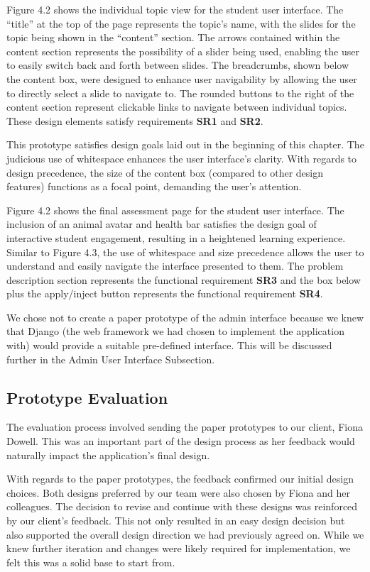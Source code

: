 \documentclass{l3proj}
\begin{document}
Figure 4.2 shows the individual topic view for the student user interface. The ``title'' at the top of the page represents the topic's name, with the slides for the topic being shown in the ``content'' section. The arrows contained within the content section represents the possibility of a slider being used, enabling the user to easily switch back and forth between slides. The breadcrumbs, shown below the content box, were designed to enhance user navigability by allowing the user to directly select a slide to navigate to. The rounded buttons to the right of the content section represent clickable links to navigate between individual topics. These design elements satisfy requirements \textbf{SR1} and \textbf{SR2}.

This prototype satisfies design goals laid out in the beginning of this chapter. The judicious use of whitespace enhances the user interface's clarity. With regards to design precedence, the size of the content box (compared to other design features) functions as a focal point, demanding the user's attention. 

Figure 4.2 shows the final assessment page for the student user interface. The inclusion of an animal avatar and health bar satisfies the design goal of interactive student engagement, resulting in a heightened learning experience. Similar to Figure 4.3, the use of whitespace and size precedence allows the user to understand and easily navigate the interface presented to them. The problem description section represents the functional requirement \textbf{SR3} and the box below plus the apply/inject button represents the functional requirement \textbf{SR4}.  

We chose not to create a paper prototype of the admin interface because we knew that Django (the web framework we had chosen to implement the application with) would provide a suitable pre-defined interface. This will be discussed further in the Admin User Interface Subsection. 
 
\subsection{Prototype Evaluation}

The evaluation process involved sending the paper prototypes to our client, Fiona Dowell. This was an important part of the design process as her feedback would naturally impact the application's final design. 

With regards to the paper prototypes, the feedback confirmed our initial design choices. Both designs preferred by our team were also chosen by Fiona and her colleagues. The decision to revise and continue with these designs was reinforced by our client's feedback. This not only resulted in an easy design decision but also supported the overall design direction we had previously agreed on. While we knew further iteration and changes were likely required for implementation, we felt this was a solid base to start from.
\end{document}
